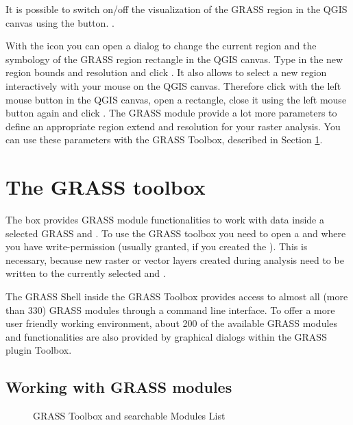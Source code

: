 It is possible to switch on/off the visualization of the GRASS region in the
QGIS canvas using the 
button. .

With the  icon you
can open a dialog to change the current region and the symbology of the GRASS
region rectangle in the QGIS canvas. Type in the new region bounds and
resolution and click . It also allows to select a new region
interactively with your mouse on the QGIS canvas. Therefore click with the
left mouse button in the QGIS canvas, open a rectangle, close it using the
left mouse button again and click .
The GRASS module  provide a lot more parameters to define
an appropriate region extend and resolution for your raster analysis. You can
use these parameters with the GRASS Toolbox, described in Section
\ref{subsec:grass_toolbox}.

\section{The GRASS toolbox}\label{subsec:grass_toolbox}

The  box provides GRASS module
functionalities to work with data inside a selected GRASS 
and . To use the GRASS toolbox you need to open a
 and  where you have write-permission
(usually granted, if you created the ). This is necessary,
because new raster or vector layers created during analysis need to be written
to the currently selected  and .

The GRASS Shell inside the GRASS Toolbox provides access to almost all (more
than 330) GRASS modules through a command line interface. To offer a more user
friendly working environment, about 200 of the available GRASS modules and
functionalities are also provided by graphical dialogs within the GRASS plugin Toolbox.

\subsection{Working with GRASS modules}\label{grass_modules}

\begin{figure}[ht]
\centering
   \hspace{0.5cm}
\caption{GRASS Toolbox and searchable Modules List \nixcaption}\label{fig:grass_modules}
\end{figure}

